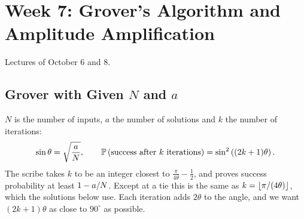 \section{Week 7: Grover's Algorithm and Amplitude Amplification}\label{sec:week7}

Lectures of October 6 and 8.

\begin{opentable}
\end{opentable}

\subsection{Grover with Given $N$ and $a$}

$N$ is the number of inputs, $a$ the number of solutions and $k$ the number of iterations:
\[\sin\theta = \sqrt{\frac{a}{N}},
    \qquad
    \operatorname{\mathbb{P}}\left(\text{success after } k \text{ iterations}\right) = \sin^2\left((2k+1)\theta\right).\]
The scribe takes $k$ to be an integer closest to $\frac{\pi}{4\theta} - \frac{1}{2}$, and proves
success probability at least $1 - a/N$. Except at a tie this is the same as
$k = \floor{\sfrac{\pi}{(4\theta)}}$, which the solutions below use. Each iteration adds $2\theta$
to the angle, and we want $(2k+1)\theta$ as close to $90^\circ$ as possible.

